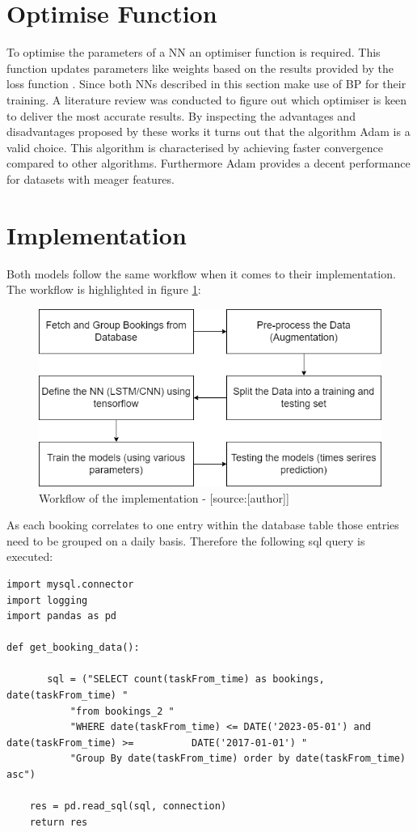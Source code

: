 \section{Optimise Function}
\label{sec:optimize_func}
To optimise the parameters of a NN an optimiser function is required. This function updates parameters like weights based on the results provided by the loss function \cite{optimizer}. Since both NNs described in this section make use of BP for their training. A literature review was conducted to figure out which optimiser is keen to deliver the most accurate results. By inspecting the advantages and disadvantages proposed by these works \cite{optimizer}\cite{otimizer_1}\cite{optimizer_2} it turns out that the algorithm Adam is a valid choice. This algorithm is characterised by achieving faster convergence compared to other algorithms. Furthermore Adam provides a decent performance for datasets with meager features.

\section{Implementation}
\label{sec:implementation}
Both models follow the same workflow when it comes to their implementation. The workflow is highlighted in figure \ref{fig:workflow}:

\begin{figure}[H]
	\centering
		\includegraphics[width=12cm]{images/workflow_imp}
	\caption{Workflow of the implementation - [source:[author]]}
	\label{fig:workflow}
\end{figure}

As each booking correlates to one entry within the database table those entries need to be grouped on a daily basis. Therefore the following sql query is executed: 
\begin{lstlisting}
import mysql.connector
import logging
import pandas as pd

def get_booking_data():

       sql = ("SELECT count(taskFrom_time) as bookings, date(taskFrom_time) "
           "from bookings_2 "
           "WHERE date(taskFrom_time) <= DATE('2023-05-01') and date(taskFrom_time) >= 			DATE('2017-01-01') "
           "Group By date(taskFrom_time) order by date(taskFrom_time) asc")

    res = pd.read_sql(sql, connection)
    return res
\end{lstlisting}


